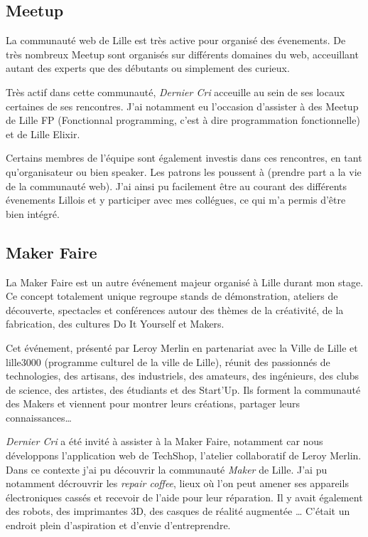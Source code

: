 \subsection{Meetup}\label{meetup}

\bigskip

La communauté web de Lille est très active pour organisé des évenements.
De très nombreux Meetup sont organisés sur différents domaines du web,
acceuillant autant des experts que des débutants ou simplement des
curieux.

\bigskip

Très actif dans cette communauté, \emph{Dernier Cri} acceuille au sein
de ses locaux certaines de ses rencontres. J'ai notamment eu l'occasion
d'assister à des Meetup de Lille FP (Fonctionnal programming, c'est à
dire programmation fonctionnelle) et de Lille Elixir.

\bigskip

Certains membres de l'équipe sont également investis dans ces
rencontres, en tant qu'organisateur ou bien speaker. Les patrons les
poussent à (prendre part a la vie de la communauté web). J'ai ainsi pu
facilement être au courant des différents évenements Lillois et y
participer avec mes collégues, ce qui m'a permis d'être bien intégré.

\bigskip

\subsection{Maker Faire}\label{maker-faire}

\bigskip

La Maker Faire est un autre événement majeur organisé à Lille durant mon
stage. Ce concept totalement unique regroupe stands de démonstration,
ateliers de découverte, spectacles et conférences autour des thèmes de
la créativité, de la fabrication, des cultures Do It Yourself et Makers.

\bigskip

Cet événement, présenté par Leroy Merlin en partenariat avec la Ville de
Lille et lille3000 (programme culturel de la ville de Lille), réunit des
passionnés de technologies, des artisans, des industriels, des amateurs,
des ingénieurs, des clubs de science, des artistes, des étudiants et des
Start'Up. Ils forment la communauté des Makers et viennent pour montrer
leurs créations, partager leurs connaissances\ldots{}

\bigskip

\emph{Dernier Cri} a été invité à assister à la Maker Faire, notamment
car nous développons l'application web de TechShop, l'atelier
collaboratif de Leroy Merlin. Dans ce contexte j'ai pu découvrir la
communauté \emph{Maker} de Lille. J'ai pu notamment décrouvrir les
\emph{repair coffee}, lieux où l'on peut amener ses appareils
électroniques cassés et recevoir de l'aide pour leur réparation. Il y
avait également des robots, des imprimantes 3D, des casques de réalité
augmentée \ldots{} C'était un endroit plein d'aspiration et d'envie
d'entreprendre.

